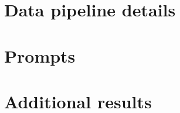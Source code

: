 \section{Data pipeline details}
\label{app:pipeline}

\section{Prompts}
\label{app:prompts}

\section{Additional results}
\label{app:results}
